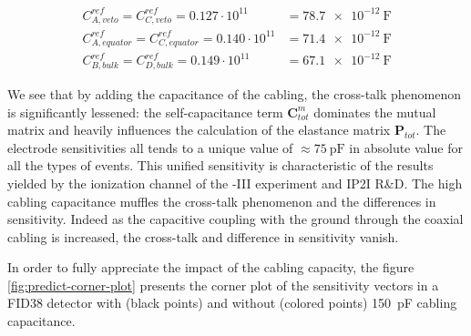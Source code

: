 \begin{align}
C_{A, veto}^{ref} = C_{C, veto}^{ref}
= 0.127 \cdot 10^{11}
&= \SI{78.7e-12}{\farad}
\\
C_{A, equator}^{ref} = C_{C, equator}^{ref}
= 0.140 \cdot 10^{11}
&= \SI{71.4e-12}{\farad}
\\
C_{B, bulk}^{ref} = C_{D, bulk}^{ref}
= 0.149 \cdot 10^{11}
&= \SI{67.1e-12}{\farad}
\end{align}

We see that by adding the capacitance of the cabling, the cross-talk phenomenon is significantly lessened: the self-capacitance term $\bm{C}^m_{tot}$ dominates the mutual matrix and heavily influences the calculation of the elastance matrix $\bm{P}_{tot}$. The electrode sensitivities all tends to a unique value of $\approx \SI{75}{\pico\farad}$ in absolute value for all the types of events. This unified sensitivity is characteristic of the results yielded by the ionization channel of the \Edelweiss{}-III experiment and IP2I R\&D. The high cabling capacitance muffles the cross-talk phenomenon and the differences in sensitivity. Indeed as the capacitive coupling with the ground through the coaxial cabling is increased, the cross-talk and difference in sensitivity vanish.

In order to fully appreciate the impact of the cabling capacity, the figure \ref{fig:predict-corner-plot} presents the corner plot of the sensitivity vectors in a FID38 detector with (black points) and without (colored points) \SI{150}{\pico\farad} cabling capacitance.

